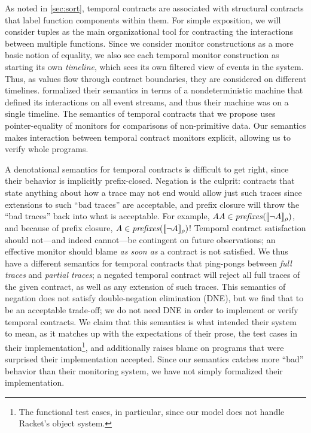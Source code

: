 %
As noted in \autoref{sec:sort}, temporal contracts are associated with structural contracts that label function components within them.
%
For simple exposition, we will consider tuples as the main organizational tool for contracting the interactions between multiple functions.
%
Since we consider monitor constructions as a more basic notion of equality, we also see each temporal monitor construction as starting its own \emph{timeline}, which sees its own filtered view of events in the system.
%
Thus, as values flow through contract boundaries, they are considered on different timelines.
%
\dfm formalized their semantics in terms of a nondeterministic machine that defined its interactions on all event streams, and thus their machine was on a single timeline.
%
The semantics of temporal contracts that we propose uses pointer-equality of monitors for comparisons of non-primitive data.
%
Our semantics makes interaction between temporal contract monitors explicit, allowing us to verify whole programs.

A denotational semantics for temporal contracts is difficult to get right, since their behavior is implicitly prefix-closed.
%
Negation is the culprit: contracts that state anything about how a trace may not end would allow just such traces since extensions to such ``bad traces'' are acceptable, and prefix closure will throw the ``bad traces'' back into what is acceptable.
%
%
For example, $AA \in \mathit{prefixes}([\![ \neg A ]\!]_{\rho})$, and because of prefix closure, $A \in \mathit{prefixes}([\![ \neg A ]\!]_{\rho})$!
%
Temporal contract satisfaction should not---and indeed cannot---be contingent on future observations; an effective monitor should blame \emph{as soon as} a contract is not satisfied.
%
We thus have a different semantics for temporal contracts that ping-pongs between \emph{full traces} and \emph{partial traces}; a negated temporal contract will reject all full traces of the given contract, as well as any extension of such traces.
%
This semantics of negation does not satisfy double-negation elimination (DNE), but we find that to be an acceptable trade-off; we do not need DNE in order to implement or verify temporal contracts.
%
We claim that this semantics is what \dfm intended their system to mean, as it matches up with the expectations of their prose, the test cases in their implementation\footnote{The functional test cases, in particular, since our model does not handle Racket's object system.}, and additionally raises blame on programs that \dfm were surprised their implementation accepted.
%
Since our semantics catches more ``bad'' behavior than their monitoring system, we have not simply formalized their implementation.

